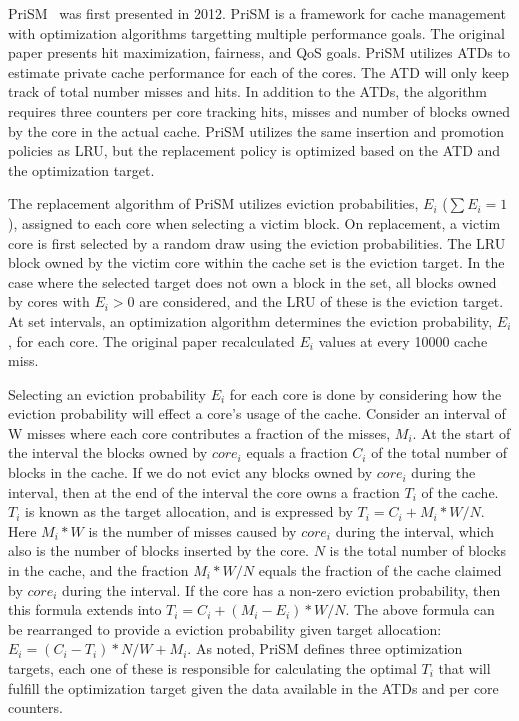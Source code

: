 PriSM~\cite{manikantan12} was first presented in 2012.
PriSM is a framework for cache management with optimization algorithms targetting multiple performance goals.
The original paper presents hit maximization, fairness, and QoS goals.
PriSM utilizes ATDs to estimate private cache performance for each of the cores.
The ATD will only keep track of total number misses and hits.
In addition to the ATDs, the algorithm requires three counters per core tracking hits, misses and number of blocks owned by the core in the actual cache.
PriSM utilizes the same insertion and promotion policies as LRU, but the replacement policy is optimized based on the ATD and the optimization target.

The replacement algorithm of PriSM utilizes eviction probabilities, $E_i$ ($\sum{E_i} = 1$), assigned to each core when selecting a victim block.
On replacement, a victim core is first selected by a random draw using the eviction probabilities.
The LRU block owned by the victim core within the cache set is the eviction target.
In the case where the selected target does not own a block in the set, all blocks owned by cores with $E_i > 0$ are considered, and the LRU of these is the eviction target.
At set intervals, an optimization algorithm determines the eviction probability, $E_i$, for each core.
The original paper recalculated $E_i$ values at every 10000 cache miss.

Selecting an eviction probability $E_i$ for each core is done by considering how the eviction probability will effect a core's usage of the cache.
Consider an interval of W misses where each core contributes a fraction of the misses, $M_i$.
At the start of the interval the blocks owned by $core_i$ equals a fraction $C_i$ of the total number of blocks in the cache.
If we do not evict any blocks owned by $core_i$ during the interval, then at the end of the interval the core owns a fraction $T_i$ of the cache.
$T_i$ is known as the target allocation, and is expressed by $T_i = C_i + M_i * W/N$. 
Here $M_i * W$ is the number of misses caused by $core_i$ during the interval, which also is the number of blocks inserted by the core.
$N$ is the total number of blocks in the cache, and the fraction $M_i * W/N$ equals the fraction of the cache claimed by $core_i$ during the interval.
If the core has a non-zero eviction probability, then this formula extends into $T_i = C_i + (M_i - E_i) * W/N$.
The above formula can be rearranged to provide a eviction probability given target allocation: $E_i = (C_i - T_i) * N/W + M_i$.
As noted, PriSM defines three optimization targets, each one of these is responsible for calculating the optimal $T_i$ that will fulfill the optimization target given the data available in the ATDs and per core counters.

